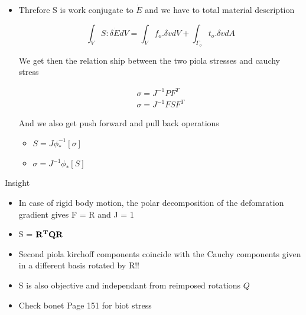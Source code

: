 	\begin{frame}
		\begin{itemize}
			\item Threfore S is work conjugate to $ \dot{E}$ and we have to total material description
			\begin{block}{}
				\begin{equation}
					\int_V S:\delta \dot{E} dV = \int_V f_o.\delta v dV + \int_{\Gamma_o} t_o.\delta v dA
				\end{equation}
			\end{block}
			We get then the relation ship between the two piola stresses and cauchy stress
			\begin{block}{}
				\begin{equation}
					\begin{aligned}
					\sigma = J^{-1}PF^T \\
					\sigma = J^{-1}FSF^T
					\end{aligned}
				\end{equation}
			\end{block}
			And we also get push forward and pull back operations 
			\begin{itemize}
				\item $S = J \phi_*^{-1}[\sigma]$
				\item $\sigma = J^{-1} \phi_* [S]$
			\end{itemize}
		\end{itemize}
	\end{frame}

	\begin{frame}{Insight}
		\begin{itemize}
			\item In case of rigid body motion, the polar decomposition of the defomration gradient gives F = R and J = 1
			\item S =  $\mathbf{R^TQR}$
			\item Second piola kirchoff components coincide  with the Cauchy components given in a different basis rotated by R!!
			\item S is also objective and independant from reimposed rotations $Q$
			\item Check bonet Page 151 for biot stress
		\end{itemize}
	\end{frame}


